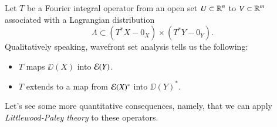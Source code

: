 



Let $T$ be a Fourier integral operator from an open set $U \subset \operatorname{\mathbb{R}}^n$ to $V \subset \operatorname{\mathbb{R}}^m$ associated with a Lagrangian distribution
%
\[ \Lambda \subset (T^* X - 0_X) \times (T^* Y - 0_Y). \]
%
Qualitatively speaking, wavefront set analysis tells us the following:
%
\begin{itemize}
	\item $T$ maps $\DD(X)$ into $\operatorname{\mathcal{E}}(Y)$.

	\item $T$ extends to a map from $\operatorname{\mathcal{E}}(X)^*$ into $\DD(Y)^*$.
\end{itemize}
%
Let's see some more quantitative consequences, namely, that we can apply \emph{Littlewood-Paley theory} to these operators.

